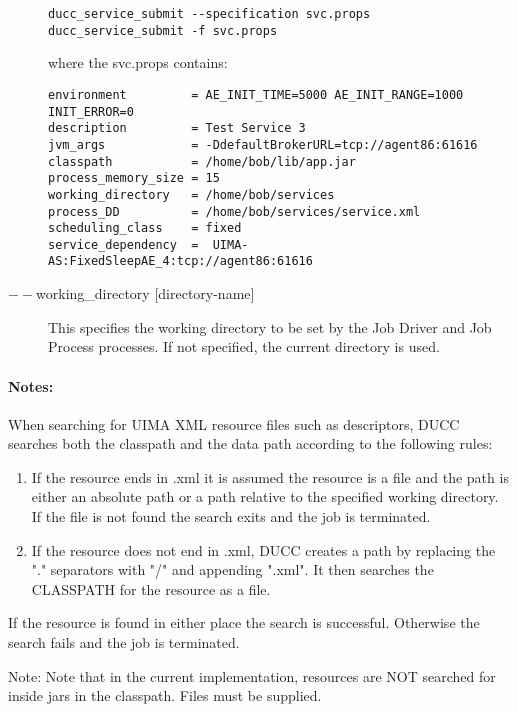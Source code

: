 \begin{description}
\begin{verbatim}
ducc_service_submit --specification svc.props 
ducc_service_submit -f svc.props 
\end{verbatim}
        
        where the svc.props contains: 

\begin{verbatim}
environment         = AE_INIT_TIME=5000 AE_INIT_RANGE=1000 INIT_ERROR=0
description         = Test Service 3
jvm_args            = -DdefaultBrokerURL=tcp://agent86:61616
classpath           = /home/bob/lib/app.jar
process_memory_size = 15
working_directory   = /home/bob/services
process_DD          = /home/bob/services/service.xml
scheduling_class    = fixed
service_dependency  =  UIMA-AS:FixedSleepAE_4:tcp://agent86:61616
\end{verbatim}
        
        \item[$--$working\_directory {[directory-name]}]
          This specifies the working directory to be set by the Job Driver and Job Process processes. 
          If not specified, the current directory is used.
    \end{description}
        
    \paragraph{Notes:}
    When searching for UIMA XML resource files such as descriptors, DUCC searches both the 
    classpath and the data path according to the following rules: 

    \begin{enumerate}
        \item If the resource ends in .xml it is assumed the resource is a file and the path is either
          an absolute path or a path relative to the specified working directory. If the file is not
          found the search exits and the job is terminated.

        \item If the resource does not end in .xml, DUCC creates a path by replacing the "." 
          separators with "/" and appending ".xml". It then searches the CLASSPATH for the 
          resource as a file. 
    \end{enumerate}

    If the resource is found in either place the search is successful. Otherwise the search 
    fails and the job is terminated. 

    Note: Note that in the current implementation, resources are NOT searched    
    for inside jars in the classpath. Files must be supplied. 

